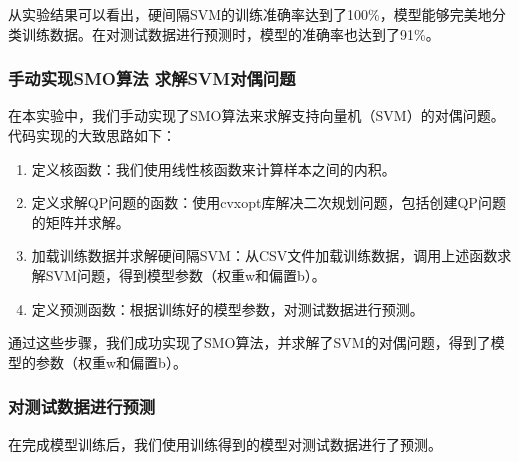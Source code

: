 \documentclass[12pt]{article}
\begin{document}
从实验结果可以看出，硬间隔SVM的训练准确率达到了100\%，模型能够完美地分类训练数据。在对测试数据进行预测时，模型的准确率也达到了91\%。



\subsubsection{手动实现SMO算法 求解SVM对偶问题}

在本实验中，我们手动实现了SMO算法来求解支持向量机（SVM）的对偶问题。代码实现的大致思路如下：
\begin{enumerate}
  \item 定义核函数：我们使用线性核函数来计算样本之间的内积。
  \item 定义求解QP问题的函数：使用cvxopt库解决二次规划问题，包括创建QP问题的矩阵并求解。
  \item 加载训练数据并求解硬间隔SVM：从CSV文件加载训练数据，调用上述函数求解SVM问题，得到模型参数（权重w和偏置b）。
  \item 定义预测函数：根据训练好的模型参数，对测试数据进行预测。
\end{enumerate}

通过这些步骤，我们成功实现了SMO算法，并求解了SVM的对偶问题，得到了模型的参数（权重w和偏置b）。

\subsubsection{对测试数据进行预测}

在完成模型训练后，我们使用训练得到的模型对测试数据进行了预测。



\end{document}
